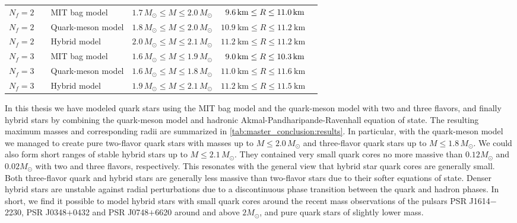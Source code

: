 \begin{table}[b!]
{\begin{tabular}{ c l l c c c }
	$N_f=2$ & \Cref{chap:mit} & MIT bag model & $1.7 \, M_\odot \leq M \leq 2.0 \, M_\odot$ & $\hphantom{1}\SI{9.6}{\kilo\meter} \leq R \leq \SI{11.0}{\kilo\meter}$ \\
	$N_f=2$ & \Cref{chap:lsm2f} & Quark-meson model & $1.8 \, M_\odot \leq M \leq 2.0 \, M_\odot$ & $\SI{10.9}{\kilo\meter} \leq R \leq \SI{11.2}{\kilo\meter}$ \\
	$N_f=2$ & \Cref{chap:hybrid} & Hybrid model & $2.0 \, M_\odot \leq M \leq 2.1 \, M_\odot$ & $\SI{11.2}{\kilo\meter} \leq R \leq \SI{11.2}{\kilo\meter}$ \\
	\midrule
	$N_f=3$ & \Cref{chap:mit} & MIT bag model & $1.6 \, M_\odot \leq M \leq 1.9 \, M_\odot$ & $\hphantom{1}\SI{9.0}{\kilo\meter} \leq R \leq \SI{10.3}{\kilo\meter}$ \\
	$N_f=3$ & \Cref{chap:lsm3f} & Quark-meson model & $1.6 \, M_\odot \leq M \leq 1.8 \, M_\odot$ & $\SI{11.0}{\kilo\meter} \leq R \leq \SI{11.6}{\kilo\meter}$ \\
	$N_f=3$ & \Cref{chap:hybrid} & Hybrid model & $1.9 \, M_\odot \leq M \leq 2.1 \, M_\odot$ & $\SI{11.2}{\kilo\meter} \leq R \leq \SI{11.5}{\kilo\meter}$ \\
	\bottomrule
\end{tabular}}
\end{table}

In this thesis we have modeled quark stars using the MIT bag model and the quark-meson model with two and three flavors,
and finally hybrid stars by combining the quark-meson model and hadronic Akmal-Pandharipande-Ravenhall equation of state.
The resulting maximum masses and corresponding radii are summarized in \cref{tab:master_conclusion:results}.
In particular, with the quark-meson model we managed to create pure two-flavor quark stars with masses up to $M \leq 2.0 \, M_\odot$ and three-flavor quark stars up to $M \leq 1.8 \, M_\odot$.
We could also form short ranges of stable hybrid stars up to $M \leq 2.1 \, M_\odot$.
They contained very small quark cores no more massive than $0.12 M_\odot$ and $0.02 M_\odot$ with two and three flavors, respectively.
This resonates with the general view that hybrid star quark cores are generally small. \cite{ref:quark_star_review} 
Both three-flavor quark and hybrid stars are generally less massive than two-flavor stars due to their softer equations of state.
Denser hybrid stars are unstable against radial perturbations due to a discontinuous phase transition between the quark and hadron phases.
In short, we find it possible to model hybrid stars with small quark cores around the recent mass observations of the pulsars PSR J1614$-$2230, PSR J0348$+$0432 and PSR J0748$+$6620 around and above $2 M_\odot$,
and pure quark stars of slightly lower mass.

